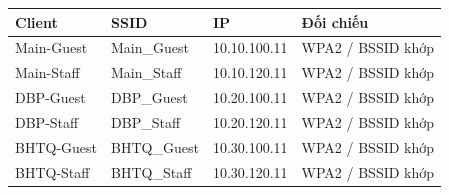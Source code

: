 \begin{tabularx}{\linewidth}{@{}lXXl@{}}\toprule
Client & SSID & IP & Đối chiếu\\\midrule
Main-Guest & Main\_Guest & 10.10.100.11 & WPA2 / BSSID khớp\\
Main-Staff & Main\_Staff & 10.10.120.11 & WPA2 / BSSID khớp\\
DBP-Guest & DBP\_Guest & 10.20.100.11 & WPA2 / BSSID khớp\\
DBP-Staff & DBP\_Staff & 10.20.120.11 & WPA2 / BSSID khớp\\
BHTQ-Guest & BHTQ\_Guest & 10.30.100.11 & WPA2 / BSSID khớp\\
BHTQ-Staff & BHTQ\_Staff & 10.30.120.11 & WPA2 / BSSID khớp\\
\bottomrule\end{tabularx}
